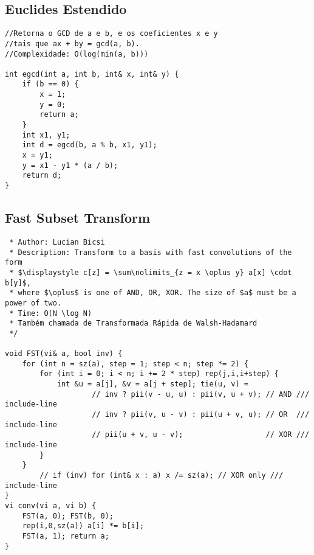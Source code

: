 \documentclass[11pt, a4paper, twoside]{article}
\begin{document}
\subsection{Euclides Estendido}
\begin{verbatim}
//Retorna o GCD de a e b, e os coeficientes x e y
//tais que ax + by = gcd(a, b).
//Complexidade: O(log(min(a, b)))

int egcd(int a, int b, int& x, int& y) {
    if (b == 0) {
        x = 1;
        y = 0;
        return a;
    }
    int x1, y1;
    int d = egcd(b, a % b, x1, y1);
    x = y1;
    y = x1 - y1 * (a / b);
    return d;
}
\end{verbatim}

\subsection{Fast Subset Transform}
\begin{verbatim}
 * Author: Lucian Bicsi
 * Description: Transform to a basis with fast convolutions of the form
 * $\displaystyle c[z] = \sum\nolimits_{z = x \oplus y} a[x] \cdot b[y]$,
 * where $\oplus$ is one of AND, OR, XOR. The size of $a$ must be a power of two.
 * Time: O(N \log N)
 * Também chamada de Transformada Rápida de Walsh-Hadamard
 */

void FST(vi& a, bool inv) {
	for (int n = sz(a), step = 1; step < n; step *= 2) {
		for (int i = 0; i < n; i += 2 * step) rep(j,i,i+step) {
			int &u = a[j], &v = a[j + step]; tie(u, v) =
    				// inv ? pii(v - u, u) : pii(v, u + v); // AND /// include-line
    				// inv ? pii(v, u - v) : pii(u + v, u); // OR  /// include-line
    				// pii(u + v, u - v);                   // XOR /// include-line
		}
	}
    	// if (inv) for (int& x : a) x /= sz(a); // XOR only /// include-line
}
vi conv(vi a, vi b) {
	FST(a, 0); FST(b, 0);
	rep(i,0,sz(a)) a[i] *= b[i];
	FST(a, 1); return a;
}
\end{verbatim}
\end{document}
